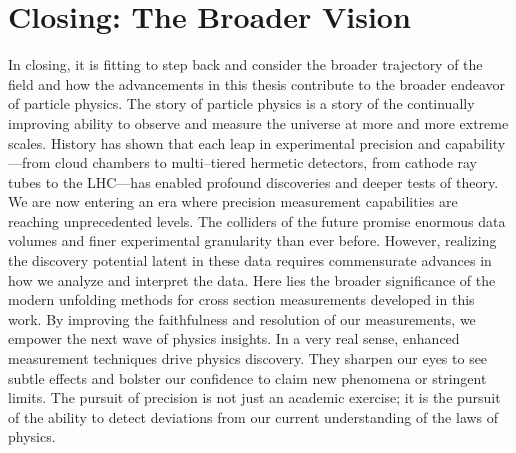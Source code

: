 \section{Closing: The Broader Vision}
    In closing, it is fitting to step back and consider the broader trajectory of the field and how the advancements in this thesis contribute to the broader endeavor of particle physics.
    The story of particle physics is a story of the continually improving ability to observe and measure the universe at more and more extreme scales.
    History has shown that each leap in experimental precision and capability---from cloud chambers to multi--tiered hermetic detectors, from cathode ray tubes to the LHC---has enabled profound discoveries and deeper tests of theory.
    We are now entering an era where precision measurement capabilities are reaching unprecedented levels.
    The colliders of the future promise enormous data volumes and finer experimental granularity than ever before.
    However, realizing the discovery potential latent in these data requires commensurate advances in how we analyze and interpret the data.
    Here lies the broader significance of the modern unfolding methods for cross section measurements developed in this work.
    By improving the faithfulness and resolution of our measurements, we empower the next wave of physics insights.
    In a very real sense, enhanced measurement techniques drive physics discovery.
    They sharpen our eyes to see subtle effects and bolster our confidence to claim new phenomena or stringent limits.
    The pursuit of precision is not just an academic exercise; it is the pursuit of the ability to detect deviations from our current understanding of the laws of physics.
                
